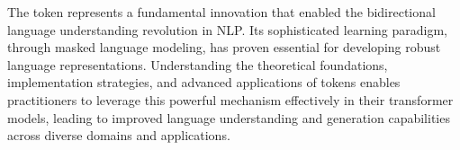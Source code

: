 The \mask{} token represents a fundamental innovation that enabled the bidirectional language understanding revolution in NLP. Its sophisticated learning paradigm, through masked language modeling, has proven essential for developing robust language representations. Understanding the theoretical foundations, implementation strategies, and advanced applications of \mask{} tokens enables practitioners to leverage this powerful mechanism effectively in their transformer models, leading to improved language understanding and generation capabilities across diverse domains and applications.